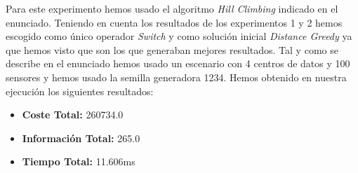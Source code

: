 \documentclass{article}
\begin{document}
\begin{enumerate}
  Para este experimento hemos usado el algoritmo \textit{Hill Climbing} indicado en el enunciado. Teniendo en cuenta los resultados de los experimentos 1 y 2 hemos escogido como único operador \textit{Switch} y como solución inicial \textit{Distance Greedy} ya que hemos visto que son los que generaban mejores resultados. Tal y como se describe en el enunciado hemos usado un escenario con 4 centros de datos y 100 sensores y hemos usado la semilla generadora 1234. Hemos obtenido en nuestra ejecución los siguientes resultados:
  \begin{itemize}
    \item \textbf{Coste Total:} 260734.0
    \item \textbf{Información Total:} 265.0
    \item \textbf{Tiempo Total:} 11.606ms
  \end{itemize}
  \end{enumerate}

\newpage
\end{document}
